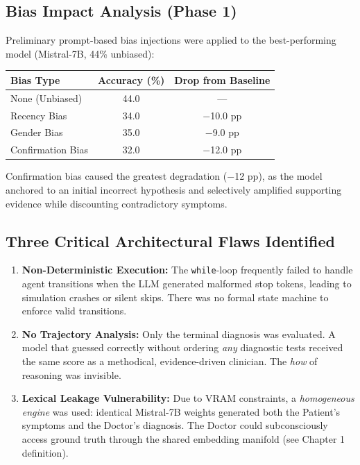 \subsection{Bias Impact Analysis (Phase 1)}

Preliminary prompt-based bias injections were applied to the best-performing model (Mistral-7B, 44\% unbiased):

\begin{center}
\begin{tabular}{@{}lcc@{}}
\toprule
\textbf{Bias Type} & \textbf{Accuracy (\%)} & \textbf{Drop from Baseline} \\
\midrule
None (Unbiased)     & 44.0 & --- \\
Recency Bias        & 34.0 & $-$10.0 pp \\
Gender Bias         & 35.0 & $-$9.0 pp \\
Confirmation Bias   & 32.0 & $-$12.0 pp \\
\bottomrule
\end{tabular}
\end{center}

Confirmation bias caused the greatest degradation ($-$12 pp), as the model anchored to an initial incorrect hypothesis and selectively amplified supporting evidence while discounting contradictory symptoms.

\subsection{Three Critical Architectural Flaws Identified}

\begin{enumerate}[label=\textbf{Flaw \arabic*:}]
    \item \textbf{Non-Deterministic Execution:} The \texttt{while}-loop frequently failed to handle agent transitions when the LLM generated malformed stop tokens, leading to simulation crashes or silent skips. There was no formal state machine to enforce valid transitions.
    
    \item \textbf{No Trajectory Analysis:} Only the terminal diagnosis was evaluated. A model that guessed correctly without ordering \textit{any} diagnostic tests received the same score as a methodical, evidence-driven clinician. The \textit{how} of reasoning was invisible.
    
    \item \textbf{Lexical Leakage Vulnerability:} Due to VRAM constraints, a \textit{homogeneous engine} was used: identical Mistral-7B weights generated both the Patient's symptoms and the Doctor's diagnosis. The Doctor could subconsciously access ground truth through the shared embedding manifold (see Chapter 1 definition).
\end{enumerate}

